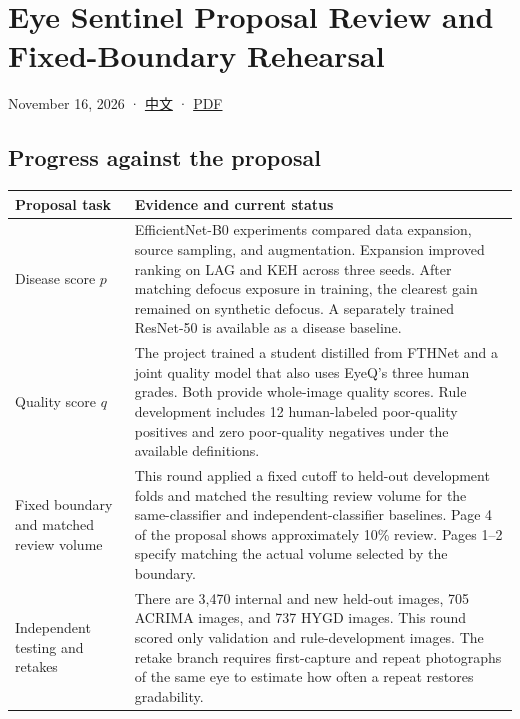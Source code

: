 \documentclass[
  10pt,
  letterpaper,
]{article}
\author{}
\date{}
\newcounter{none} %
\begin{document}
\section{Eye Sentinel Proposal Review and Fixed-Boundary
Rehearsal}\label{eye-sentinel-proposal-review-and-fixed-boundary-rehearsal}

November 16, 2026 · \href{proposal-review.zh.md}{中文} ·
\href{proposal-review.en.pdf}{PDF}

\subsection{Progress against the
proposal}\label{progress-against-the-proposal}

{\def\LTcaptype{none} %
\begin{longtable}[]{@{}
  >{\raggedright\arraybackslash}p{}
  >{\raggedright\arraybackslash}p{}@{}}
\toprule\noalign{}
\begin{minipage}[b]{\linewidth}\raggedright
Proposal task
\end{minipage} & \begin{minipage}[b]{\linewidth}\raggedright
Evidence and current status
\end{minipage} \\
\midrule\noalign{}
\endhead
\bottomrule\noalign{}
\endlastfoot
Disease score \(p\) & EfficientNet-B0 experiments compared data
expansion, source sampling, and augmentation. Expansion improved ranking
on LAG and KEH across three seeds. After matching defocus exposure in
training, the clearest gain remained on synthetic defocus. A separately
trained ResNet-50 is available as a disease baseline. \\
Quality score \(q\) & The project trained a student distilled from
FTHNet and a joint quality model that also uses EyeQ's three human
grades. Both provide whole-image quality scores. Rule development
includes 12 human-labeled poor-quality positives and zero poor-quality
negatives under the available definitions. \\
Fixed boundary and matched review volume & This round applied a fixed
cutoff to held-out development folds and matched the resulting review
volume for the same-classifier and independent-classifier baselines.
Page 4 of the proposal shows approximately 10\% review. Pages 1--2
specify matching the actual volume selected by the boundary. \\
Independent testing and retakes & There are 3,470 internal and new
held-out images, 705 ACRIMA images, and 737 HYGD images. This round
scored only validation and rule-development images. The retake branch
requires first-capture and repeat photographs of the same eye to
estimate how often a repeat restores gradability. \\
\end{longtable}
}
\end{document}
